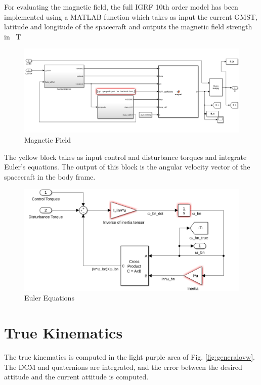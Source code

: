 \documentclass[11pt,a4paper]{report}
\begin{document}
For evaluating the magnetic field, the full IGRF 10th order model has been implemented using a MATLAB function which takes as input the current GMST, latitude and longitude of the spacecraft and outputs the magnetic field strength in \SI{}{\tesla} 

\begin{figure}[H]
 \centering
 \includegraphics[scale=0.4]{gfx/simulink/magfield.png}
 \caption{Magnetic Field} 
 \label{fig:magfield}
\end{figure}

The yellow block takes as input control and disturbance torques and integrate Euler's equations. The output of this block is the angular velocity vector of the spacecraft in the body frame.

\begin{figure}[H]
 \centering
 \includegraphics[scale=0.4]{gfx/simulink/eulerequation.png}
 \caption{Euler Equations} 
 \label{fig:eulerequation}
\end{figure}

\section{True Kinematics}
The true kinematics is computed in the light purple area of Fig. \ref{fig:generalovw}. 
The DCM and quaternions are integrated, and the error between the desired attitude and the current attitude is computed.
\end{document}
